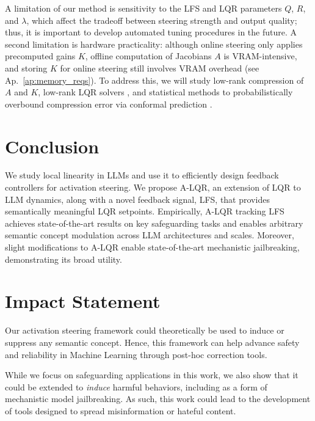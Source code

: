 \documentclass{article}
\theoremstyle{plain}
\theoremstyle{definition}
\theoremstyle{remark}
\begin{document}
A limitation of our method is sensitivity to the LFS and LQR parameters $Q$, $R$, and $\lambda$, which affect the tradeoff between steering strength and output quality; thus, it is important to develop automated tuning procedures in the future. A second limitation is hardware practicality: although online steering only applies precomputed gains $K$, offline computation of Jacobians $A$ is VRAM-intensive, and storing $K$ for online steering still involves VRAM overhead (see Ap.~\ref{ap:memory_reqs}). To address this, we will study low-rank compression of $A$ and $K$, low-rank LQR solvers \cite{cho2023low}, and statistical methods to probabilistically overbound compression error via conformal prediction \cite{srinivasan2026safety}.

\vspace{-12pt}
\section{Conclusion}
\vspace{-5pt}

We study local linearity in LLMs and use it to efficiently design feedback controllers for activation steering. We propose A-LQR, an extension of LQR to LLM dynamics, along with a novel feedback signal, LFS, that provides semantically meaningful LQR setpoints. Empirically, A-LQR tracking LFS achieves state-of-the-art results on key safeguarding tasks and enables arbitrary semantic concept modulation across LLM architectures and scales. Moreover, slight modifications to A-LQR enable state-of-the-art mechanistic jailbreaking, demonstrating its broad utility.

\newpage
\section*{Impact Statement}

Our activation steering framework could theoretically be used to induce or suppress any semantic concept. Hence, this framework can help advance safety and reliability in Machine Learning through post-hoc correction tools. 

While we focus on safeguarding applications in this work, we also show that it could be extended to \textit{induce} harmful behaviors, including as a form of mechanistic model jailbreaking. As such, this work could lead to the development of tools designed to spread misinformation or hateful content.


\nocite{langley00}
\end{document}
